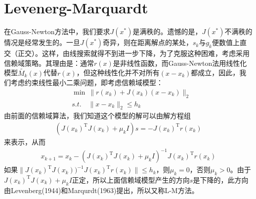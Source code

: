 \section{Levenerg-Marquardt}
    \par
    在Gauss-Newton方法中，我们要求$J(x^*)$是满秩的。遗憾的是，$J(x^*)$不满秩的情况是经常发生的。一旦$J(x^*)$奇异，则在距离解点的某处，$s_k$与$g_k$便数值上直交（正交）。这样，由线搜索就得不到进一步下降，为了克服这种困难，考虑采用信赖域策略。其理由是：通常$r(x)$是非线性函数，而Gauss-Newton法用线性化模型$\tilde{M_k}(x)$代替$r(x)$，但这种线性化并不对所有$(x-x_k)$都成立，因此，我们考虑约束线性最小二乘问题，即考虑信赖域模型：
    \begin{align*}
    &\min\  \|r(x_k)+J(x_k)(x-x_k)\|_2\\
    &s.t.\quad \|x-x_k\|_2 \leqslant h_k
    \end{align*}
    由前面的信赖域算法，我们知道这个模型的解可以由解方程组
    \begin{align*}
    (J(x_k)^\mathrm{T} J(x_k)+{\mu}_kI)s=-J(x_k)^\mathrm{T} r(x_k)
    \end{align*}
    来表示，从而
    \begin{align*}
    x_{k+1}=x_k-(J(x_k)^\mathrm{T} J(x_k)+{\mu}_kI)^{-1}J(x_k)^\mathrm{T} r(x_k)
    \end{align*}
    如果$\|J(x_k)^\mathrm{T} J(x_k))^{-1}J(x_k)^\mathrm{T} r(x_k)\| \leqslant h_k$，则${\mu}_k=0$，否则${\mu}_k>0$。由于$J(x_k)^\mathrm{T} J(x_k)+{\mu}_kI$正定，所以上面信赖域模型产生的方向$s$是下降的，此方向由Levenberg(1944)和Marqurdt(1963)提出，所以又称L-M方法。
